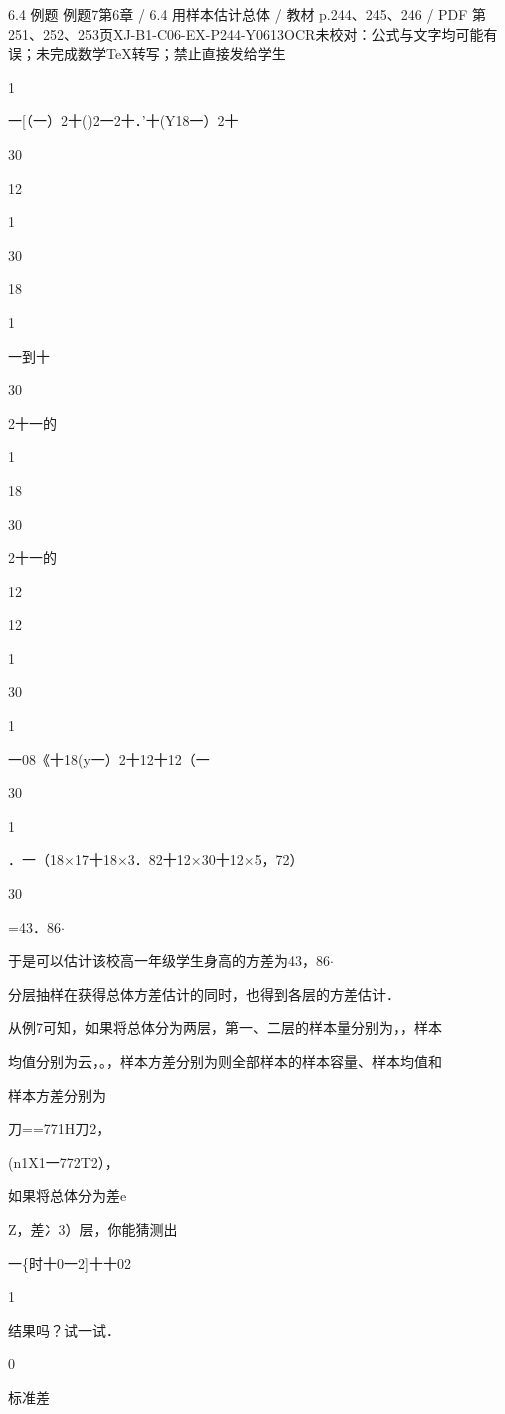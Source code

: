 \begin{bankitem}{6.4 例题 例题7}{第6章 / 6.4 用样本估计总体 / 教材 p.244、245、246 / PDF 第251、252、253页}{XJ-B1-C06-EX-P244-Y0613}{OCR未校对：公式与文字均可能有误；未完成数学TeX转写；禁止直接发给学生}
\begin{ocrdraft}
1
\par
一[（一）2十()2一2十．'十(Y18一）2十
\par
30
\par
12
\par
1
\par
30
\par
18
\par
1
\par
一到十
\par
30
\par
[教材p.245 / PDF第252页]
\par
2十一的
\par
1
\par
18
\par
30
\par
2十一的
\par
12
\par
12
\par
1
\par
30
\par
1
\par
一08《十18(y一）2十12十12（一
\par
30
\par
1
\par
．一（18\ensuremath{\times}17十18\ensuremath{\times}3．82十12\ensuremath{\times}30十12\ensuremath{\times}5，72）
\par
30
\par
=43．86\ensuremath{\cdot}
\par
于是可以估计该校高一年级学生身高的方差为43，86\ensuremath{\cdot}
\par
分层抽样在获得总体方差估计的同时，也得到各层的方差估计．
\par
从例7可知，如果将总体分为两层，第一、二层的样本量分别为，，样本
\par
均值分别为云，。，样本方差分别为则全部样本的样本容量、样本均值和
\par
样本方差分别为
\par
刀==771H刀2，
\par
{}(n1X1一772T2），
\par
如果将总体分为差e
\par
Z，差冫3）层，你能猜测出
\par
一\{时十0一2]十十02
\par
1
\par
结果吗？试一试．
\par
0
\par
标准差
\par

\end{ocrdraft}
\end{bankitem}
